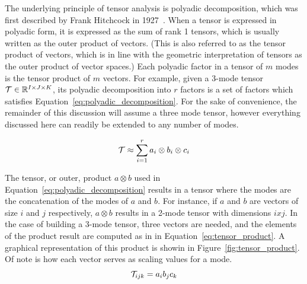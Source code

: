 \documentclass[../ut-dissertation.tex]{subfiles}
\begin{document}
The underlying principle of tensor analysis is polyadic decomposition,
which was first described by Frank Hitchcock in
1927~\cite{hitchcock1927}.  When a tensor is expressed in polyadic
form, it is expressed as the sum of rank 1 tensors, which is usually
written as the outer product of vectors.  (This is also referred to as
the tensor product of vectors, which is in line with the geometric
interpretation of tensors as the outer product of vector spaces.)
Each polyadic factor in a tensor of $m$ modes is the tensor product of
$m$ vectors.  For example, given a 3-mode tensor $\mathcal{T} \in
\mathbb{R}^{I\times J \times K}$, its polyadic decomposition into $r$ factors
is a set of factors which satisfies
Equation~\ref{eq:polyadic_decomposition}.  For the sake of
convenience, the remainder of this discussion will assume a three
mode tensor, however everything discussed here can readily be extended
to any number of modes.

\begin{equation} \label{eq:polyadic_decomposition}
  \mathcal{T} \approx \displaystyle\sum_{i=1}^{r} a_i \otimes b_i
  \otimes c_i
\end{equation}

The tensor, or outer,  product $a \otimes b$ used in
Equation~\ref{eq:polyadic_decomposition} results in a tensor where the
modes are the concatenation of the modes of $a$ and $b$.  For
instance, if $a$ and $b$ are vectors of size $i$ and $j$ respectively,
$a \otimes b$ results in a 2-mode tensor with dimensions $i x j$.  In
the case of building a 3-mode tensor, three vectors are needed, and
the elements of the product result are computed as in in
Equation~\ref{eq:tensor_product}. A graphical representation of this
product is showin in Figure~\ref{fig:tensor_product}.  Of note is
how each vector serves as scaling values for a mode.  
\begin{equation} \label{eq:tensor_product}
  \mathcal{T}_{ijk} = a_i b_j c_k
\end{equation}
\end{document}
